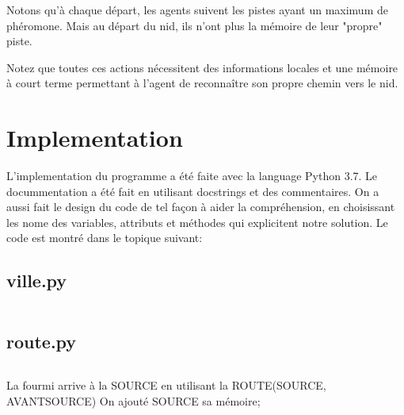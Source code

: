 \documentclass{rapportECL}
\begin{document}
Notons qu’à chaque départ, les agents suivent les pistes ayant un maximum de phéromone. Mais au départ du nid, ils n’ont plus la mémoire de leur "propre" piste.

Notez que toutes ces actions nécessitent des informations locales et une mémoire à court terme permettant à l’agent de reconnaître son propre chemin vers le nid.

\section{Implementation}

L'implementation du programme a été faite avec la language Python 3.7. Le docummentation a été fait en utilisant docstrings et des commentaires. On a aussi fait le design du code de tel façon  à aider la compréhension, en choisissant les nome des variables, attributs et méthodes qui explicitent notre solution. Le code est montré dans le topique suivant:

\subsection{ville.py}

\inputminted{python}{scr/ville.py}

\subsection{route.py}

\inputminted{python}{scr/route.py}

La fourmi arrive à la SOURCE en utilisant la ROUTE(SOURCE, AVANTSOURCE)
On ajouté SOURCE sa mémoire;




\end{document}
